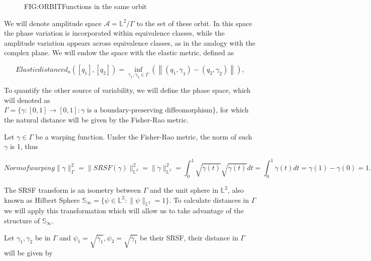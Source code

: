 \begin{figure}[Functions in the same orbit]{FIG:ORBIT}{Functions in the same orbit}
   \quad
\end{figure}

We will denote amplitude space $\mathscr{A}= \mathbb{L}^{2} / \Gamma$  to the
set of these orbit. In this space the phase variation is incorporated within
equivalence classes, while the amplitude variation appears across equivalence
classes, as in the analogy with the complex plane. We will endow the space with
the elastic metric, defined as

\begin{equation}[EQ:ELASTIC]{Elastic distance}
d_{a}\left(\left[q_{1}\right],\left[q_{2}\right]\right)=\inf _{
\gamma_{1}, \gamma_{2} \in {\Gamma}}\left(\left\|\left(q_{1},
 \gamma_{1}\right)-\left(q_{2}, \gamma_{2}\right)\right\|\right),
\end{equation}

To quantify the other source of variability, we will define the phase space,
which will denoted as
$\Gamma = \{\gamma :[0,1] \rightarrow[0,1]  : \gamma \text{ is a boundary-preserving diffeomorphism}\}$,
for which the natural distance will be given by the Fisher-Rao metric.

Let $\gamma \in \Gamma$ be a warping function. Under the Fisher-Rao metric,
the norm of such $\gamma$ is 1, thus

\begin{equation}[]{Norm of warping}
\| \gamma \|_\Gamma^2 = \| SRSF(\gamma)\|_{\mathbb{L}^2}^2 =  \| \dot \gamma\|_{\mathbb{L}^2}^2 =
\int_0^1 \sqrt{\dot \gamma (t)} \sqrt{\dot \gamma (t)}dt =
\int_0^1 \dot \gamma(t)dt = \gamma(1) - \gamma(0) = 1.
\end{equation}

The  \acs{SRSF} transform is an isometry between $\Gamma$ and the unit sphere in
$\mathbb{L}^2$, also known as Hilbert Sphere
$\mathbb{S}_\infty = \{ \psi \in \mathbb{L}^2 : \|\psi\|_{\mathbb{L}^2}=1\}$.
To calculate distances in $\Gamma$ we will apply this transformation which will
allow us to take advantage of the structure of $\mathbb{S}_\infty$.

Let $\gamma_1, \gamma_2$ be in $\Gamma$ and $\psi_1=\sqrt{\dot \gamma_1},
\psi_2=\sqrt{\dot \gamma_1}$ be their  \acs{SRSF}, their distance in $\Gamma$ will be
given by

